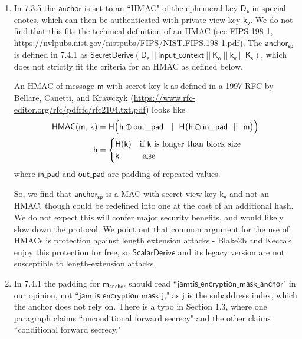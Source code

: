 \documentclass{article}
\theoremstyle{definition}
\newcommand{\6}{\mathbf}
\newcommand{\7}{\mathcal}
\newcommand{\sect}[1]{{\text{Section }#1}}
\newcommand{\secr}[1]{{\mathsf{SecretDerive}(\sf{#1})}}
\renewcommand{\sf}[1]{{\mathsf{#1}}}
\begin{document}
\begin{enumerate}
    \item In \sect{7.3.5} the $\sf{anchor}$ is set to an ``HMAC" of the ephemeral key $\sf{D_e}$ in special enotes, which can then be authenticated with private view key $\sf{k_v}$. We do not find that this fits the technical definition of an HMAC (see FIPS 198-1, \url{https://nvlpubs.nist.gov/nistpubs/FIPS/NIST.FIPS.198-1.pdf}). The $\sf{anchor_{sp}}$ is defined in \sect{7.4.1} as $\secr{\sf{D_e} \ || \ \sf{input\_context} \ || \ \sf{K_o} \ || \ \sf{k_v} \ || \ \sf{K_s}}$, which does not strictly fit the criteria for an HMAC as defined below. 
    \medskip 

    An HMAC of message $\sf{m}$ with secret key $\sf{k}$ as defined in a 1997 RFC by Bellare, Canetti, and Krawczyk (\url{https://www.rfc-editor.org/rfc/pdfrfc/rfc2104.txt.pdf}) looks like 
    \begin{align*}
        \sf{HMAC(m, \, k)} &= \sf{H \Bigl( h \oplus out\_pad \ \ || \ \ H \bigl( h \oplus in\_pad \ \ || \ \ m \bigr) \Bigr)} \\ 
        \sf{h} &= 
        \begin{cases}
            \sf{H(k)} & \text{if}\ \sf{k} \text{ is longer than block size} \\
            \sf{k} & \text{ else}
        \end{cases}
    \end{align*}
    where $\sf{in\_pad}$ and $\sf{out\_pad}$ are padding of repeated values.
 
    So, we find that $\sf{anchor_{sp}}$ is a MAC with secret view key $\sf{k_v}$ and not an HMAC, though could be redefined into one at the cost of an additional hash. We do not expect this will confer major security benefits, and would likely slow down the protocol. 
    We point out that common argument for the use of HMACs is protection against length extension attacks - Blake2b \cite{Blake} and Keccak \cite{Keccak} enjoy this protection for free, so $\sf{ScalarDerive}$ and its legacy version are not susceptible to length-extension attacks.


    \item In \sect{7.4.1} the padding for $\sf{m_{anchor}}$ should read ``$\sf{jamtis\_encryption\_mask\_anchor}$" in our opinion, not ``$\sf{jamtis\_encryption\_mask\_j}$," as $\sf{j}$ is the subaddress index, which the anchor does not rely on. There is a typo in Section 1.3, where one paragraph claims ``unconditional forward secrecy" and the other claims ``conditional forward secrecy."


\end{enumerate}
\end{document}
